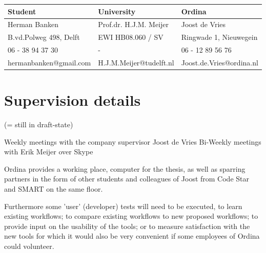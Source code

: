 \documentclass[11pt,a4paper]{article}
\begin{document}
\begin{table}[h]
\centering
\begin{tabular}{@{}lll@{}}
\textbf{Student}       & \textbf{University}     & \textbf{Ordina}        \\\hline
Herman Banken          & Prof.dr. H.J.M. Meijer  & Joost de Vries         \\
B.vd.Polweg 498, Delft & EWI HB08.060 / SV       & Ringwade 1, Nieuwegein \\
06 - 38 94 37 30       & -                       & 06 - 12 89 56 76       \\ 
hermanbanken@gmail.com & H.J.M.Meijer@tudelft.nl & Joost.de.Vries@ordina.nl
\end{tabular}
\end{table}

\section{Supervision details}
(= still in draft-state)

Weekly meetings with the company supervisor Joost de Vries
Bi-Weekly meetings with Erik Meijer over Skype

Ordina provides a working place, computer for the thesis, as well as sparring partners in the form of other students and colleagues of Joost from Code Star and SMART on the same floor.

Furthermore some 'user' (developer) tests will need to be executed, 
to learn existing workflows;
to compare existing workflows to new proposed workflows;
to provide input on the usability of the tools;
or to measure satisfaction with the new tools
for which it would also be very convenient if some employees of Ordina could volunteer.

{}


%
%
%
%
%
%
\end{document}
